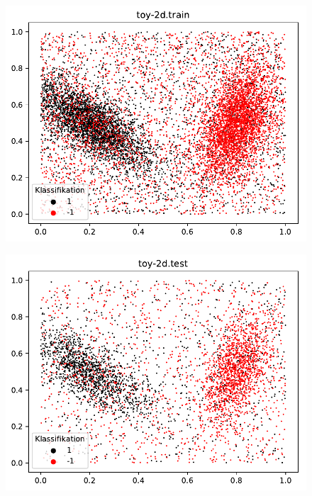 \documentclass{beamer}
\begin{document}
\begin{figure}[h]
\centering
\includegraphics[scale=0.7]{toy-2d-train.pdf}
\label{bananas}
\end{figure}

\begin{figure}[h]
\centering
\includegraphics[scale=0.7]{toy-2d-test.pdf}
\label{bananas}
\end{figure}
\end{document}
